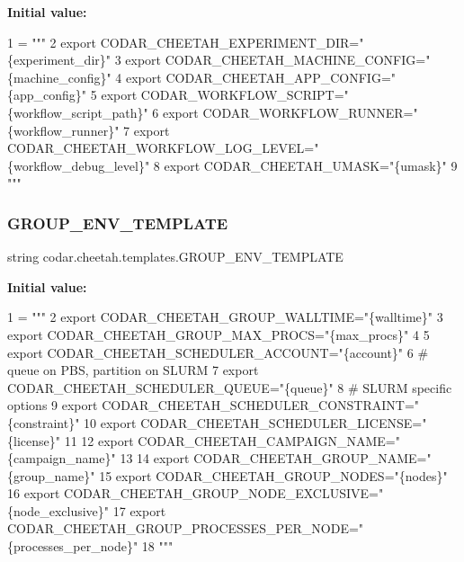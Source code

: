 {\bfseries Initial value\+:}
\begin{DoxyCode}
1 =  \textcolor{stringliteral}{"""}
2 \textcolor{stringliteral}{export CODAR\_CHEETAH\_EXPERIMENT\_DIR="\{experiment\_dir\}"}
3 \textcolor{stringliteral}{export CODAR\_CHEETAH\_MACHINE\_CONFIG="\{machine\_config\}"}
4 \textcolor{stringliteral}{export CODAR\_CHEETAH\_APP\_CONFIG="\{app\_config\}"}
5 \textcolor{stringliteral}{export CODAR\_WORKFLOW\_SCRIPT="\{workflow\_script\_path\}"}
6 \textcolor{stringliteral}{export CODAR\_WORKFLOW\_RUNNER="\{workflow\_runner\}"}
7 \textcolor{stringliteral}{export CODAR\_CHEETAH\_WORKFLOW\_LOG\_LEVEL="\{workflow\_debug\_level\}"}
8 \textcolor{stringliteral}{export CODAR\_CHEETAH\_UMASK="\{umask\}"}
9 \textcolor{stringliteral}{"""}
\end{DoxyCode}
\mbox{\label{namespacecodar_1_1cheetah_1_1templates_a5f3128e651f6b9b80eb8c492b2f3edd1}} 
\subsubsection{\texorpdfstring{G\+R\+O\+U\+P\+\_\+\+E\+N\+V\+\_\+\+T\+E\+M\+P\+L\+A\+TE}{GROUP\_ENV\_TEMPLATE}}
{\footnotesize\ttfamily string codar.\+cheetah.\+templates.\+G\+R\+O\+U\+P\+\_\+\+E\+N\+V\+\_\+\+T\+E\+M\+P\+L\+A\+TE}

{\bfseries Initial value\+:}
\begin{DoxyCode}
1 =  \textcolor{stringliteral}{"""}
2 \textcolor{stringliteral}{export CODAR\_CHEETAH\_GROUP\_WALLTIME="\{walltime\}"}
3 \textcolor{stringliteral}{export CODAR\_CHEETAH\_GROUP\_MAX\_PROCS="\{max\_procs\}"}
4 \textcolor{stringliteral}{}
5 \textcolor{stringliteral}{export CODAR\_CHEETAH\_SCHEDULER\_ACCOUNT="\{account\}"}
6 \textcolor{stringliteral}{# queue on PBS, partition on SLURM}
7 \textcolor{stringliteral}{export CODAR\_CHEETAH\_SCHEDULER\_QUEUE="\{queue\}"}
8 \textcolor{stringliteral}{# SLURM specific options}
9 \textcolor{stringliteral}{export CODAR\_CHEETAH\_SCHEDULER\_CONSTRAINT="\{constraint\}"}
10 \textcolor{stringliteral}{export CODAR\_CHEETAH\_SCHEDULER\_LICENSE="\{license\}"}
11 \textcolor{stringliteral}{}
12 \textcolor{stringliteral}{export CODAR\_CHEETAH\_CAMPAIGN\_NAME="\{campaign\_name\}"}
13 \textcolor{stringliteral}{}
14 \textcolor{stringliteral}{export CODAR\_CHEETAH\_GROUP\_NAME="\{group\_name\}"}
15 \textcolor{stringliteral}{export CODAR\_CHEETAH\_GROUP\_NODES="\{nodes\}"}
16 \textcolor{stringliteral}{export CODAR\_CHEETAH\_GROUP\_NODE\_EXCLUSIVE="\{node\_exclusive\}"}
17 \textcolor{stringliteral}{export CODAR\_CHEETAH\_GROUP\_PROCESSES\_PER\_NODE="\{processes\_per\_node\}"}
18 \textcolor{stringliteral}{"""}
\end{DoxyCode}
